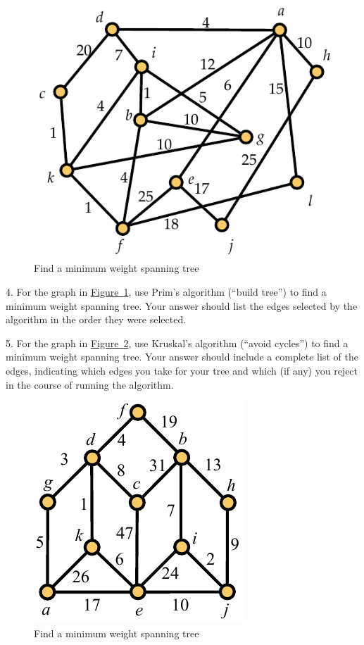 \documentclass[10pt,]{book}
\theoremstyle{plain}
\theoremstyle{definition}
\theoremstyle{definition}
\theoremstyle{definition}
\theoremstyle{definition}
\numberwithin{equation}{section}
\begin{document}
\begin{exerciselist}
\begin{figure}
\centering
\includegraphics[width=0.65\linewidth]{images/span_tree_ex2}
\caption{Find a minimum weight spanning tree\label{fig_span_tree_ex2}}
\end{figure}
\par\smallskip
\item[4.]\hypertarget{exercise-16}{}\hypertarget{p-249}{}%
For the graph in \hyperref[fig_span_tree_ex2]{Figure~\ref{fig_span_tree_ex2}}, use Prim's algorithm (``build tree'') to find a minimum weight spanning tree. Your answer should list the edges selected by the algorithm in the order they were selected.%
\par\smallskip
\item[5.]\hypertarget{exercise-17}{}\hypertarget{p-250}{}%
For the graph in \hyperref[fig_span_tree_ex3]{Figure~\ref{fig_span_tree_ex3}}, use Kruskal's algorithm (``avoid cycles'') to find a minimum weight spanning tree. Your answer should include a complete list of the edges, indicating which edges you take for your tree and which (if any) you reject in the course of running the algorithm.%
\begin{figure}
\centering
\includegraphics[width=0.45\linewidth]{images/span_tree_ex3}
\caption{Find a minimum weight spanning tree\label{fig_span_tree_ex3}}

\end{figure}
\end{exerciselist}
\end{document}
